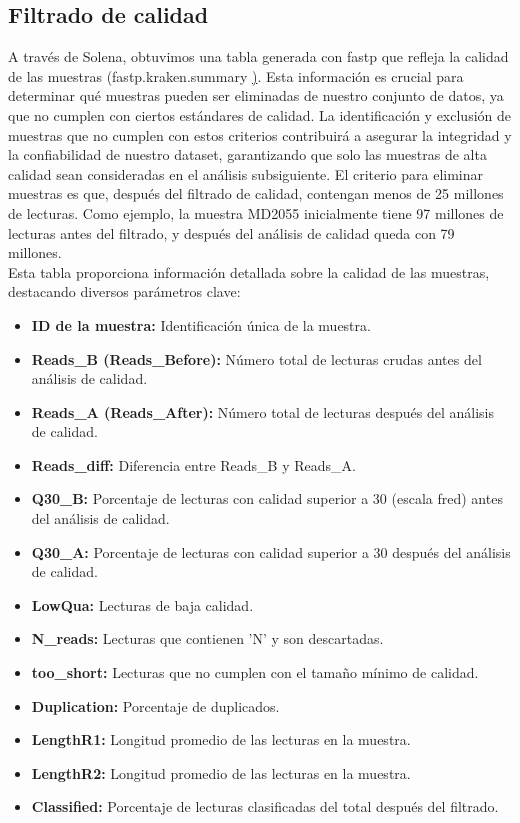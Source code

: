 \subsection{Filtrado de calidad}
\label{sec:met-filtrado}

A través de Solena, obtuvimos una tabla generada con fastp \citep{chen2018fastp} que refleja la calidad de las muestras 
(fastp.kraken.summary \href{https://github.com/CamilaSilva1995/Tesis_Maestria/blob/main/Analisis_Comparativo/Fresa_Solena/01_Exploracion.pdf}). 
Esta información es crucial para determinar qué muestras pueden ser eliminadas de nuestro conjunto 
de datos, ya que no cumplen con ciertos estándares de calidad. La identificación y exclusión de 
muestras que no cumplen con estos criterios contribuirá a asegurar la integridad y la confiabilidad 
de nuestro dataset, garantizando que solo las muestras de alta calidad sean consideradas en el análisis 
subsiguiente. 
El criterio para eliminar muestras es que, 
después del filtrado de calidad, contengan menos de 25 millones de lecturas. Como ejemplo, la muestra MD2055 inicialmente tiene 97 millones de lecturas antes del filtrado, 
y después del análisis de calidad queda con 79 millones.
\\
Esta tabla proporciona información detallada sobre la calidad de las muestras, destacando 
diversos parámetros clave:
\begin{itemize}
  \item \textbf{ID de la muestra:} Identificación única de la muestra.
  \item \textbf{Reads\_B  (Reads\_Before):} Número total de lecturas crudas antes del análisis de calidad.
  \item \textbf{Reads\_A (Reads\_After):} Número total de lecturas después del análisis de calidad.
  \item \textbf{Reads\_diff:}  Diferencia entre Reads\_B y Reads\_A.
  \item \textbf{Q30\_B:} Porcentaje de lecturas con calidad superior a 30 (escala fred) antes del análisis de calidad.
  \item \textbf{Q30\_A:} Porcentaje de lecturas con calidad superior a 30 después del análisis de calidad.
  \item \textbf{LowQua:} Lecturas de baja calidad.
  \item \textbf{N\_reads:} Lecturas que contienen 'N' y son descartadas.
  \item \textbf{too\_short:}  Lecturas que no cumplen con el tamaño mínimo de calidad.
  \item \textbf{Duplication:} Porcentaje de duplicados.
  \item \textbf{LengthR1:} Longitud promedio de las lecturas en la muestra.
  \item \textbf{LengthR2:} Longitud promedio de las lecturas en la muestra.
  \item \textbf{Classified:} Porcentaje de lecturas clasificadas del total después del filtrado.
\end{itemize}


